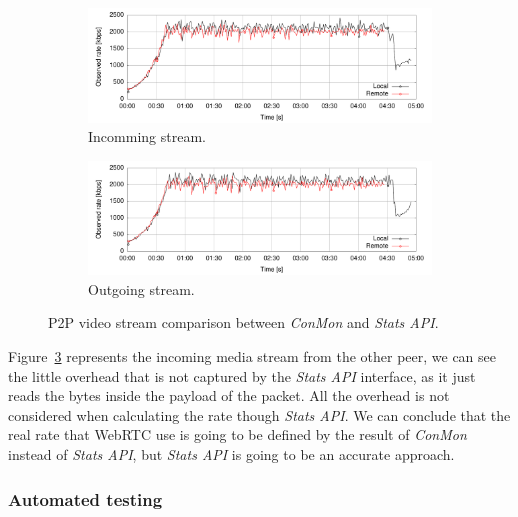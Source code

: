 \begin{figure}[h]
        \centering
        \begin{subfigure}[b]{1\textwidth}
                \centering
                \includegraphics[width=\textwidth]{./figures/p2p_incomming_cable_sample.pdf}
               \caption[Incomming stream]{Incomming stream.}
			\label{fig:p2pincommingStatsConmonWifi}
        \end{subfigure}
        \begin{subfigure}[b]{1\textwidth}
                \centering
                \includegraphics[width=\textwidth]{./figures/p2p_outgoing_cable_sample.pdf}
               \caption[Outgoing stream]{Outgoing stream.}
			\label{fig:p2poutgoingStatsConmonWifi}
	        \end{subfigure}
        \caption[P2P video stream comparison between {\it ConMon} and {\it Stats API}]{P2P video stream comparison between {\it ConMon} and {\it Stats API}.}
        \label{fig:p2pStatsConmon}
\end{figure}

Figure~\ref{fig:p2pStatsConmon} represents the incoming media stream from the other peer, we can see the little overhead that is not captured by the {\it Stats API} interface, as it just reads the bytes inside the payload of the packet. All the overhead is not considered when calculating the rate though {\it Stats API}. We can conclude that the real rate that WebRTC use is going to be defined by the result of {\it ConMon} instead of {\it Stats API}, but {\it Stats API} is going to be an accurate approach.

\subsubsection{Automated testing}

